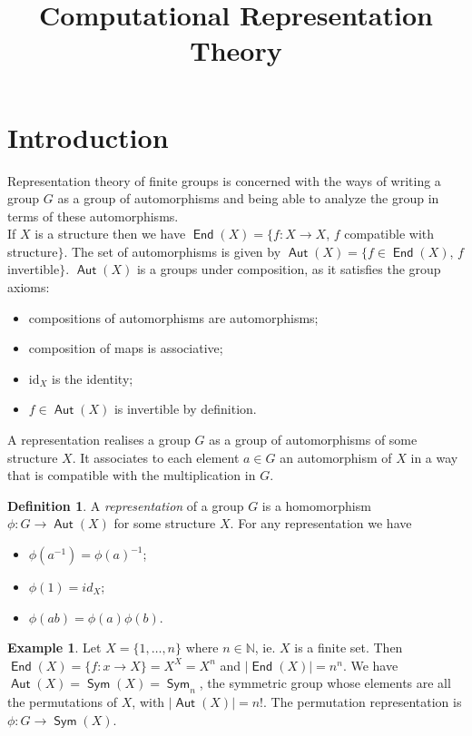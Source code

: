 \documentclass[12pt]{amsart}
\title{Computational Representation Theory}
\theoremstyle{definition}
\newtheorem{example}[theorem]{Example}
\newtheorem{definition}[theorem]{Definition}
\DeclareMathOperator{\Aut}{\mathsf{Aut}}
\DeclareMathOperator{\End}{\mathsf{End}}
\DeclareMathOperator{\Sym}{\mathsf{Sym}}
\newcommand{\Size}[1]{\left| #1 \right|}
\begin{document}
\maketitle

\tableofcontents

\section{Introduction}
\label{sec:intro}

Representation theory of finite groups is concerned with the ways of writing a group $G$ as a group of automorphisms and being able to analyze the group in terms of these automorphisms.\\
If $X$ is a structure then we have $\End(X)=\{f:X\rightarrow X$, $f$ compatible with structure$\}$.  The set of automorphisms is given by $\Aut(X)=\{f\in \End(X)$, $f$ invertible$\}$.  $\Aut(X)$ is a groups under composition, as it satisfies the group axioms:
\begin{itemize}
\item compositions of automorphisms are automorphisms; \item composition of maps is associative; \item id$_X$ is the identity; \item $f\in \Aut(X)$ is invertible by definition.
\end{itemize}
A representation realises a group $G$ as a group of automorphisms of some structure $X$.  It associates to each element $a\in G$ an automorphism of $X$ in a way that is compatible with the multiplication in $G$.

\begin{definition}
A \emph{representation} of a group $G$ is a homomorphism $\phi:G\rightarrow \Aut(X)$ for some structure $X$.  For any representation we have
\begin{itemize}
\item $\phi(a^{-1})=\phi(a)^{-1}$; \item $\phi(1)=id_X$; \item $\phi(ab)=\phi(a)\phi(b)$.
\end{itemize}
\end{definition}

\begin{example}
Let $X=\{1,\ldots,n\}$ where $n\in\mathbb{N}$, ie. $X$ is a finite set.  Then $\End(X)=\{f:x\rightarrow X\}=X^X=X^n$ and $\Size{\End(X)}=n^n$.  We have $\Aut(X)=\Sym(X)=\Sym_n$, the symmetric group whose elements are all the permutations of $X$, with $\Size{\Aut(X)}=n!$.  The permutation representation is $\phi:G\rightarrow \Sym(X)$.
\end{example}
\end{document}
